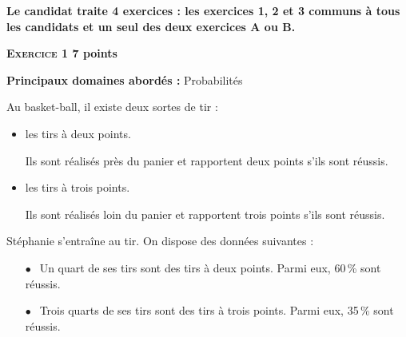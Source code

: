 \documentclass[10pt,a4paper]{article}
\begin{document}
\vspace{0,25cm}

\textbf{Le candidat traite 4 exercices : les exercices 1, 2 et 3 communs à tous les candidats et un seul des deux exercices A ou B.}

\bigskip

\textbf{\textsc{Exercice 1} \hfill 7 points}

\textbf{Principaux domaines abordés :} Probabilités

\medskip

Au basket-ball, il existe deux sortes de tir :

\begin{itemize}
\item les tirs à deux points.

Ils sont réalisés près du panier et rapportent deux points s'ils sont réussis.
\item les tirs à trois points.

Ils sont réalisés loin du panier et rapportent trois points s'ils sont réussis.
\end{itemize}

\smallskip

Stéphanie s'entraîne au tir. On dispose des données suivantes :

\begin{itemize}
\item[$\bullet~~$] Un quart de ses tirs sont des tirs à deux points. Parmi eux, 60\,\% sont réussis.
\item[$\bullet~~$] Trois quarts de ses tirs sont des tirs à trois points. Parmi eux, 35\,\% sont réussis.
\end{itemize}

\medskip
\end{document}
